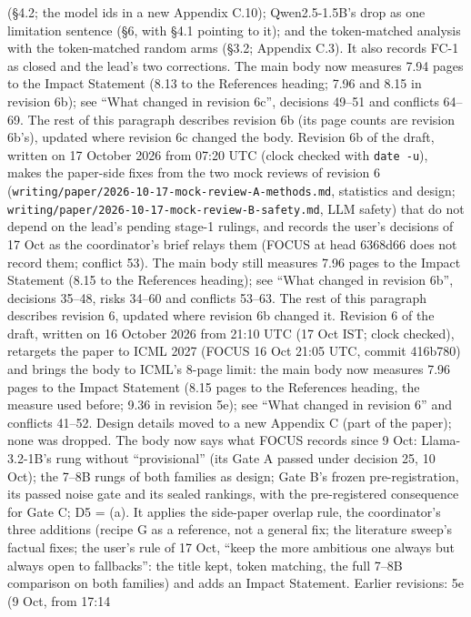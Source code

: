 \documentclass{article}
\theoremstyle{plain}
\theoremstyle{definition}
\theoremstyle{remark}
\begin{document}
(\S{}4.2; the model ids in a new Appendix C.10); Qwen2.5-1.5B's drop as one
limitation sentence (\S{}6, with \S{}4.1 pointing to it); and the token-matched
analysis with the token-matched random arms (\S{}3.2; Appendix C.3). It also
records FC-1 as closed and the lead's two corrections. The main body now
measures 7.94 pages to the Impact Statement (8.13 to the References heading;
7.96 and 8.15 in revision 6b); see ``What changed in revision 6c'', decisions
49--51 and conflicts 64--69. The rest of this paragraph describes revision 6b
(its page counts are revision 6b's), updated where revision 6c changed the body.
Revision 6b of the draft, written on 17 October 2026 from 07:20 UTC (clock
checked with \texttt{date -u}), makes the paper-side fixes from the two mock
reviews of revision 6
(\nolinkurl{writing/paper/2026-10-17-mock-review-A-methods.md}, statistics and
design; \nolinkurl{writing/paper/2026-10-17-mock-review-B-safety.md}, LLM
safety) that do not depend on the lead's pending stage-1 rulings, and records
the user's decisions of 17 Oct as the coordinator's brief relays them (FOCUS at
head 6368d66 does not record them; conflict 53). The main body still measures
7.96 pages to the Impact Statement (8.15 to the References heading); see ``What
changed in revision 6b'', decisions 35--48, risks 34--60 and conflicts 53--63.
The rest of this paragraph describes revision 6, updated where revision 6b
changed it. Revision 6 of the draft, written on 16 October 2026 from 21:10 UTC
(17 Oct IST; clock checked), retargets the paper to ICML 2027 (FOCUS 16 Oct
21:05 UTC, commit 416b780) and brings the body to ICML's 8-page limit: the main
body now measures 7.96 pages to the Impact Statement (8.15 pages to the
References heading, the measure used before; 9.36 in revision 5e); see ``What
changed in revision 6'' and conflicts 41--52. Design details moved to a new
Appendix C (part of the paper); none was dropped. The body now says what FOCUS
records since 9 Oct: Llama-3.2-1B's rung without ``provisional'' (its Gate A
passed under decision 25, 10 Oct); the 7--8B rungs of both families as design;
Gate B's frozen pre-registration, its passed noise gate and its sealed rankings,
with the pre-registered consequence for Gate C; D5 = (a). It applies the
side-paper overlap rule, the coordinator's three additions (recipe G as a
reference, not a general fix; the literature sweep's factual fixes; the user's
rule of 17 Oct, ``keep the more ambitious one always but always open to
fallbacks'': the title kept, token matching, the full 7--8B comparison on both
families) and adds an Impact Statement. Earlier revisions: 5e (9 Oct, from 17:14
\end{document}
